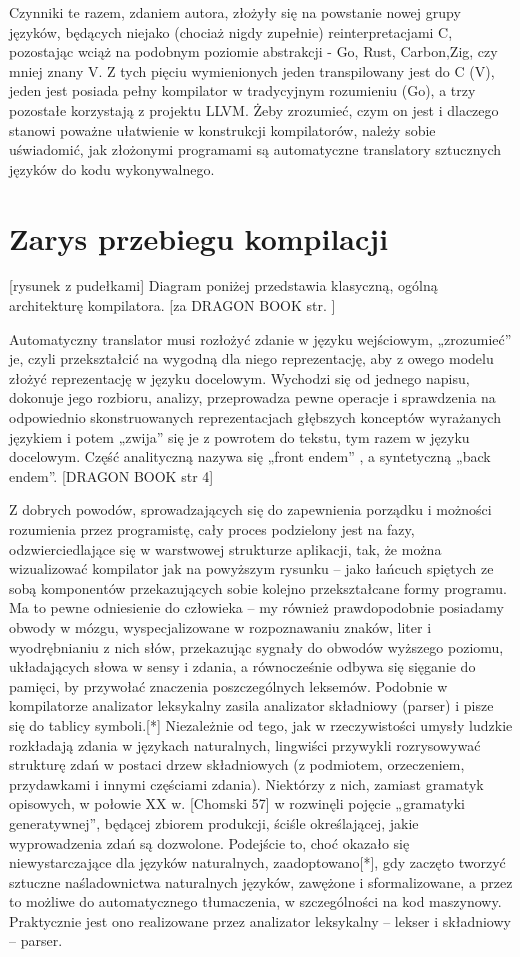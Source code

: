 Czynniki te razem, zdaniem autora, złożyły się na powstanie nowej grupy języków, będących niejako (chociaż nigdy zupełnie) reinterpretacjami C, pozostając wciąż na podobnym poziomie abstrakcji - Go, Rust, Carbon,Zig, czy mniej znany V.
Z tych pięciu wymienionych jeden transpilowany jest do C (V), jeden jest posiada pełny kompilator w tradycyjnym rozumieniu (Go), a trzy pozostałe korzystają z projektu LLVM. Żeby zrozumieć, czym on jest i dlaczego stanowi poważne ułatwienie w konstrukcji kompilatorów, należy sobie uświadomić, jak złożonymi programami są automatyczne translatory sztucznych języków do kodu wykonywalnego. 

\section{Zarys przebiegu kompilacji}
[rysunek z pudełkami]
Diagram poniżej przedstawia klasyczną, ogólną architekturę kompilatora. [za DRAGON BOOK str. ]
 
Automatyczny translator musi rozłożyć zdanie w języku wejściowym, „zrozumieć” je, czyli przekształcić na wygodną dla niego reprezentację, aby z owego modelu złożyć reprezentację w języku docelowym. Wychodzi się od jednego napisu, dokonuje jego rozbioru, analizy, przeprowadza pewne operacje i sprawdzenia na odpowiednio skonstruowanych reprezentacjach głębszych konceptów wyrażanych językiem i potem „zwija” się je z powrotem do tekstu, tym razem w języku docelowym. Część analityczną nazywa się „front endem” , a syntetyczną „back endem”. [DRAGON BOOK str 4]

Z dobrych powodów, sprowadzających się do zapewnienia porządku i możności rozumienia przez programistę, cały proces podzielony jest na fazy, odzwierciedlające się w warstwowej strukturze aplikacji, tak, że można wizualizować kompilator jak na powyższym rysunku – jako łańcuch spiętych ze sobą komponentów przekazujących sobie kolejno przekształcane formy programu. Ma to pewne odniesienie do człowieka – my również prawdopodobnie posiadamy obwody w mózgu, wyspecjalizowane w rozpoznawaniu znaków, liter i wyodrębnianiu z nich słów, przekazując sygnały do obwodów wyższego poziomu, układających słowa w sensy i zdania, a równocześnie odbywa się sięganie do pamięci, by przywołać znaczenia poszczególnych leksemów. Podobnie w kompilatorze analizator leksykalny zasila analizator składniowy (parser) i pisze się do tablicy symboli.[*]
Niezależnie od tego, jak w rzeczywistości umysły ludzkie rozkładają zdania w językach naturalnych, lingwiści przywykli rozrysowywać strukturę zdań w postaci drzew składniowych (z podmiotem, orzeczeniem, przydawkami i innymi częściami zdania). Niektórzy z nich, zamiast gramatyk opisowych, w połowie XX w. [Chomski 57] w rozwinęli pojęcie „gramatyki generatywnej”, będącej zbiorem produkcji, ściśle określającej, jakie wyprowadzenia zdań są dozwolone. Podejście to, choć okazało się niewystarczające dla języków naturalnych, zaadoptowano[*], gdy zaczęto tworzyć sztuczne naśladownictwa naturalnych języków, zawężone i sformalizowane, a przez to możliwe do automatycznego tłumaczenia, w szczególności na kod maszynowy. Praktycznie jest ono realizowane przez analizator leksykalny – lekser i składniowy – parser. 

